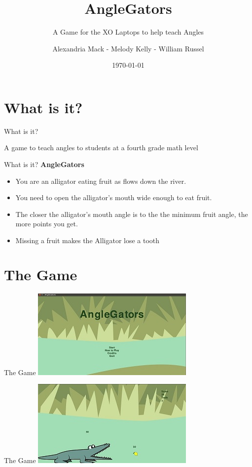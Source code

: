 \documentclass[10pt, compress]{beamer}
\title{AngleGators}
\subtitle{A Game for the XO Laptops to help teach Angles}
\date{\today}
\author{Alexandria Mack - Melody Kelly - William Russel}
\institute{}
\begin{document}
\maketitle

\section{What is it?}

\begin{frame}{What is it?}
\begin{center}A game to teach angles to students at a fourth grade math level\end{center}
\end{frame}
    
    \begin{frame}{What is it?}
    \textbf{AngleGators}
    \begin{itemize}
    \item You are an alligator eating fruit as flows down the river.
    \item You need to open the alligator's mouth wide enough to eat fruit.
    \item The closer the alligator's mouth angle is to the the minimum fruit angle, the more points you get.
    \item Missing a fruit makes the Alligator lose a tooth
    \end{itemize}
    \end{frame}

\section{The Game}

\begin{frame}{The Game}
    \centering
    \includegraphics{images/home.jpg}
\end{frame}

\begin{frame}{The Game}
\centering
\includegraphics{images/Game.jpg}
\end{frame}
\end{document}
